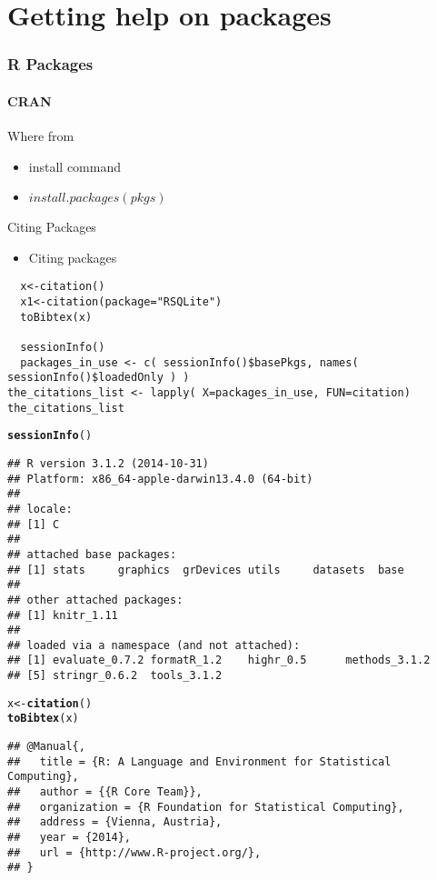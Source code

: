\documentclass{article}\usepackage[]{graphicx}\usepackage[]{color}
\makeatletter
\newcommand{\hlstd}[1]{\textcolor[rgb]{0.345,0.345,0.345}{#1}}%
\newcommand{\hlkwb}[1]{\textcolor[rgb]{0.69,0.353,0.396}{#1}}%
\newcommand{\hlkwd}[1]{\textcolor[rgb]{0.737,0.353,0.396}{\textbf{#1}}}%
\newenvironment{kframe}{%
 \def\at@end@of@kframe{}%
 \ifinner\ifhmode%
  \def\at@end@of@kframe{\end{minipage}}%
  \begin{minipage}{\columnwidth}%
 \fi\fi%
 \def\FrameCommand##1{\hskip\@totalleftmargin \hskip-\fboxsep
 \colorbox{shadecolor}{##1}\hskip-\fboxsep
     \hskip-\linewidth \hskip-\@totalleftmargin \hskip\columnwidth}%
 \MakeFramed {\advance\hsize-\width
   \@totalleftmargin\z@ \linewidth\hsize
   \@setminipage}}%
 {\par\unskip\endMakeFramed%
 \at@end@of@kframe}
\newenvironment{knitrout}{}{} %
\makeatother
\begin{document}
\section*{Getting help on packages}
\begin{frame}[fragile]
  \frametitle{R Packages}
  \framesubtitle{CRAN}
  
   \begin{block}{Where from}
  \begin{itemize} 
  \item install command
  \item $install.packages(pkgs)$
  \end{itemize}
  \end{block}
  
  \begin{block}{Citing Packages}
  \begin{itemize}
 \item Citing packages
   \end{itemize}
  \end{block}
\begin{lstlisting}
  x<-citation()
  x1<-citation(package="RSQLite")
  toBibtex(x)
  
  sessionInfo()
  packages_in_use <- c( sessionInfo()$basePkgs, names( sessionInfo()$loadedOnly ) )
the_citations_list <- lapply( X=packages_in_use, FUN=citation)
the_citations_list
\end{lstlisting}

\begin{knitrout}
\color{fgcolor}\begin{kframe}
\begin{alltt}
\hlkwd{sessionInfo}\hlstd{()}
\end{alltt}
\begin{verbatim}
## R version 3.1.2 (2014-10-31)
## Platform: x86_64-apple-darwin13.4.0 (64-bit)
## 
## locale:
## [1] C
## 
## attached base packages:
## [1] stats     graphics  grDevices utils     datasets  base     
## 
## other attached packages:
## [1] knitr_1.11
## 
## loaded via a namespace (and not attached):
## [1] evaluate_0.7.2 formatR_1.2    highr_0.5      methods_3.1.2 
## [5] stringr_0.6.2  tools_3.1.2
\end{verbatim}
\begin{alltt}
 \hlstd{x}\hlkwb{<-}\hlkwd{citation}\hlstd{()}
 \hlkwd{toBibtex}\hlstd{(x)}
\end{alltt}
\begin{verbatim}
## @Manual{,
##   title = {R: A Language and Environment for Statistical Computing},
##   author = {{R Core Team}},
##   organization = {R Foundation for Statistical Computing},
##   address = {Vienna, Austria},
##   year = {2014},
##   url = {http://www.R-project.org/},
## }
\end{verbatim}
\end{kframe}
\end{knitrout}
\end{frame}
\end{document}

